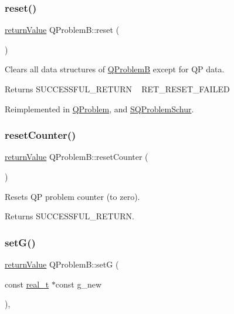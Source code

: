 \subsubsection{\texorpdfstring{reset()}{reset()}}
{\footnotesize\ttfamily \hyperlink{_message_handling_8hpp_a81d556f613bfbabd0b1f9488c0fa865e}{return\+Value} Q\+Problem\+B\+::reset (\begin{DoxyParamCaption}{ }\end{DoxyParamCaption})\hspace{0.3cm}{\ttfamily [virtual]}}

Clears all data structures of \hyperlink{class_q_problem_b}{Q\+ProblemB} except for QP data. \begin{DoxyReturn}{Returns}
S\+U\+C\+C\+E\+S\+S\+F\+U\+L\+\_\+\+R\+E\+T\+U\+RN ~\newline
 R\+E\+T\+\_\+\+R\+E\+S\+E\+T\+\_\+\+F\+A\+I\+L\+ED 
\end{DoxyReturn}


Reimplemented in \hyperlink{class_q_problem_a2f752d39b6935d929b963363a314b6bd}{Q\+Problem}, and \hyperlink{class_s_q_problem_schur_afe4cfa0c10427b11515ec5a96f883284}{S\+Q\+Problem\+Schur}.

\mbox{\label{class_q_problem_b_a29492d7ab426c13e0f6fa3b09de2476e}} 
\subsubsection{\texorpdfstring{reset\+Counter()}{resetCounter()}}
{\footnotesize\ttfamily \hyperlink{_message_handling_8hpp_a81d556f613bfbabd0b1f9488c0fa865e}{return\+Value} Q\+Problem\+B\+::reset\+Counter (\begin{DoxyParamCaption}{ }\end{DoxyParamCaption})\hspace{0.3cm}{\ttfamily [inline]}}

Resets QP problem counter (to zero). \begin{DoxyReturn}{Returns}
S\+U\+C\+C\+E\+S\+S\+F\+U\+L\+\_\+\+R\+E\+T\+U\+RN. 
\end{DoxyReturn}
\mbox{\label{class_q_problem_b_a4a907eb6c1a6ead3bf13335ce71ba069}} 
\subsubsection{\texorpdfstring{set\+G()}{setG()}}
{\footnotesize\ttfamily \hyperlink{_message_handling_8hpp_a81d556f613bfbabd0b1f9488c0fa865e}{return\+Value} Q\+Problem\+B\+::setG (\begin{DoxyParamCaption}\item[{const \hyperlink{qp_o_a_s_e_s__wrapper_8h_a0d00e2b3dfadee81331bbb39068570c4}{real\+\_\+t} $\ast$const}]{g\+\_\+new }\end{DoxyParamCaption})\hspace{0.3cm}{\ttfamily [inline]}, {\ttfamily [protected]}}

